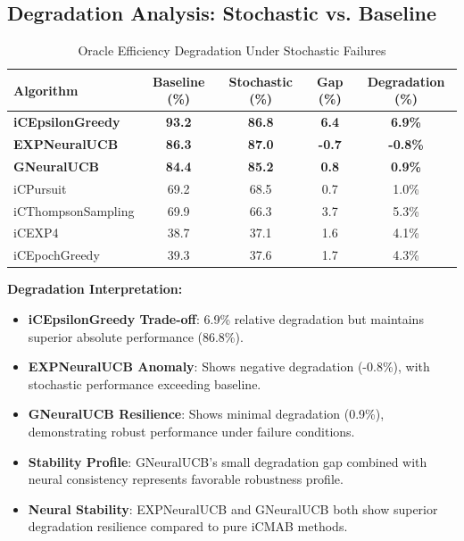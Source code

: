 \documentclass[12pt,a4paper]{article}
\newcommand{\primarytext}[1]{\textcolor{primaryblue}{\textbf{#1}}}
\newcommand{\secondarytext}[1]{\textcolor{secondaryblue}{\textbf{#1}}}
\newcommand{\success}[1]{\textcolor{accentgreen}{\textbf{#1}}}
\newcommand{\legacy}[1]{\textcolor{legacycolor}{\textbf{#1}}}
\newcommand{\neural}[1]{\textcolor{neuralcolor}{\textbf{#1}}}
\begin{document}
\subsection{Degradation Analysis: Stochastic vs. Baseline}

\begin{table}[H]
\centering
\caption{Oracle Efficiency Degradation Under Stochastic Failures}
\label{tab:degradation-analysis}
\begin{tabular}{@{}lcccc@{}}
\toprule
\textbf{Algorithm} & \textbf{Baseline (\%)} & \textbf{Stochastic (\%)} & \textbf{Gap (\%)} & \textbf{Degradation (\%)} \\
\midrule
\primarytext{iCEpsilonGreedy}   & \primarytext{93.2} & \primarytext{86.8} & \primarytext{6.4} & \primarytext{6.9\%} \\
\legacy{EXPNeuralUCB}           & \legacy{86.3} & \legacy{87.0} & \legacy{-0.7} & \legacy{-0.8\%} \\
\neural{GNeuralUCB}            & \neural{84.4} & \neural{85.2} & \neural{0.8} & \neural{0.9\%} \\
iCPursuit                       & 69.2 & 68.5 & 0.7 & 1.0\% \\
iCThompsonSampling              & 69.9 & 66.3 & 3.7 & 5.3\% \\
iCEXP4                          & 38.7 & 37.1 & 1.6 & 4.1\% \\
iCEpochGreedy                   & 39.3 & 37.6 & 1.7 & 4.3\% \\
\bottomrule
\end{tabular}
\end{table}

\textbf{Degradation Interpretation:}
\begin{itemize}
\item \primarytext{iCEpsilonGreedy Trade-off}: 6.9\% relative degradation but maintains superior absolute performance (86.8\%).
\item \legacy{EXPNeuralUCB Anomaly}: Shows negative degradation (-0.8\%), with stochastic performance exceeding baseline.
\item \neural{GNeuralUCB Resilience}: Shows minimal degradation (0.9\%), demonstrating robust performance under failure conditions.
\item \secondarytext{Stability Profile}: GNeuralUCB's small degradation gap combined with neural consistency represents favorable robustness profile.
\item \success{Neural Stability}: EXPNeuralUCB and GNeuralUCB both show superior degradation resilience compared to pure iCMAB methods.
\end{itemize}
\end{document}
